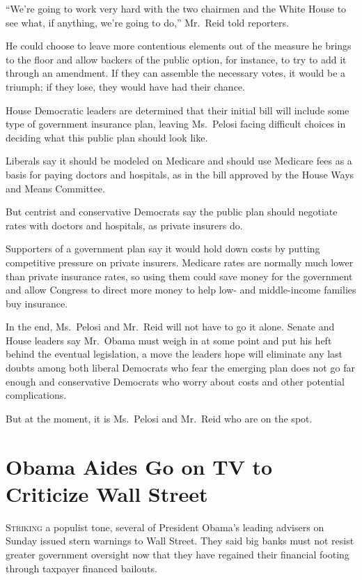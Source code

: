 ﻿\documentclass[12pt]{article}
\begin{document}
``We're going to work very hard with the two chairmen and the White House to see what, if anything,
we're going to do,'' Mr.~Reid told reporters.

He could choose to leave more contentious\cite{contentious} elements out of the measure he brings to
the floor and allow backers of the public option, for instance, to try to add it through an
amendment. If they can assemble the necessary votes, it would be a triumph\cite{triumph}; if they
lose, they would have had their chance.

House Democratic leaders are determined that their initial bill will include some type of government
insurance plan, leaving Ms.~Pelosi facing difficult choices in deciding what this public plan should
look like.

Liberals say it should be modeled on Medicare and should use Medicare fees as a basis for paying
doctors and hospitals, as in the bill approved by the House Ways and Means Committee.

But centrist and conservative Democrats say the public plan should negotiate rates with doctors and
hospitals, as private insurers do.

Supporters of a government plan say it would hold down costs by putting competitive pressure on
private insurers. Medicare rates are normally much lower than private insurance rates, so using them
could save money for the government and allow Congress to direct more money to help low- and
middle-income families buy insurance.

In the end, Ms.~Pelosi and Mr.~Reid will not have to go it alone. Senate and House leaders say
Mr.~Obama must weigh in at some point and put his heft behind the eventual legislation, a move the
leaders hope will eliminate any last doubts among both liberal Democrats who fear the emerging plan
does not go far enough and conservative Democrats who worry about costs and other potential
complications.

But at the moment, it is Ms.~Pelosi and Mr.~Reid who are on the spot.

\section{Obama Aides Go on TV to Criticize Wall Street}

\lettrine{S}{triking} a populist tone, several of President Obama's leading
advisers on Sunday issued stern warnings to Wall Street. They said big banks must not resist greater
government oversight now that they have regained their financial footing through taxpayer financed
bailouts.
\end{document}
